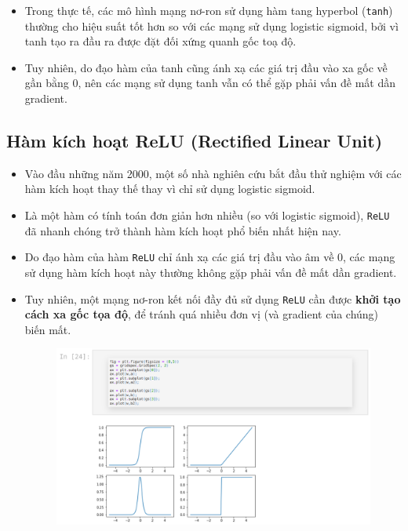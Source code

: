 \documentclass{book}
\begin{document}
\begin{itemize}
\begin{figure}[H]
            \label{fig:ac1}
        \end{figure}
        \item Trong thực tế, các mô hình mạng nơ-ron sử dụng hàm tang hyperbol (\texttt{tanh}) thường cho hiệu suất tốt hơn so với các mạng sử dụng logistic sigmoid, bởi vì tanh tạo ra đầu ra được đặt đối xứng quanh gốc toạ độ.
        \item Tuy nhiên, do đạo hàm của tanh cũng ánh xạ các giá trị đầu vào xa gốc về gần bằng 0, nên các mạng sử dụng tanh vẫn có thể gặp phải vấn đề mất dần gradient.
    \end{itemize}

    \subsection{Hàm kích hoạt ReLU (Rectified Linear Unit)}

    \begin{itemize}
        \item Vào đầu những năm 2000, một số nhà nghiên cứu bắt đầu thử nghiệm với các hàm kích hoạt thay thế thay vì chỉ sử dụng logistic sigmoid.
        \item Là một hàm có tính toán đơn giản hơn nhiều (so với logistic sigmoid), \texttt{ReLU} đã nhanh chóng trở thành hàm kích hoạt phổ biến nhất hiện nay.
        \item Do đạo hàm của hàm \texttt{ReLU} chỉ ánh xạ các giá trị đầu vào âm về 0, các mạng sử dụng hàm kích hoạt này thường không gặp phải vấn đề mất dần gradient.
        \item Tuy nhiên, một mạng nơ-ron kết nối đầy đủ sử dụng \texttt{ReLU} cần được \textbf{khởi tạo cách xa gốc tọa độ}, để tránh quá nhiều đơn vị (và gradient của chúng) biến mất.
        \begin{figure}[H]
            \centering
            \includegraphics[width=1.0\linewidth]{images/ac2.png}
            \label{fig:ac2}
        \end{figure}
    \end{itemize}
\end{document}
